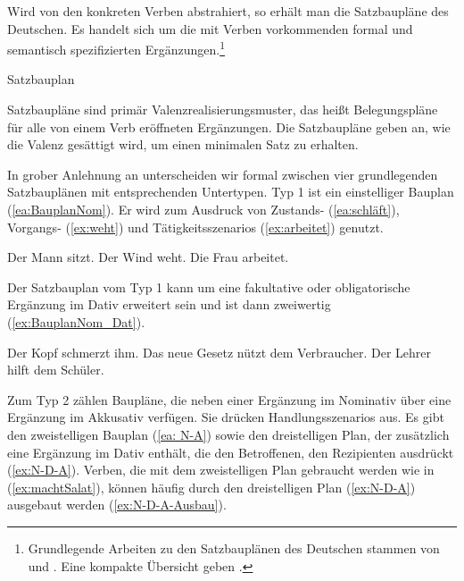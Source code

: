 Wird von den konkreten Verben abstrahiert, so erhält man die Satzbaupläne des Deutschen. Es handelt sich um die mit Verben vorkommenden formal und semantisch spezifizierten Ergänzungen.\footnote{Grundlegende Arbeiten zu den Satzbauplänen des Deutschen stammen von \citet{Engelen1975} und \citet{Engelen1975b}. Eine kompakte Übersicht geben \citet[235--241]{AgelHoellein2021}.}

\begin{Definition}{Satzbauplan}
    
\noindent Satzbaupläne sind primär Valenzrealisierungsmuster, das heißt Belegungspläne für alle von einem Verb eröffneten Ergänzungen. Die Satzbaupläne geben an, wie die Valenz gesättigt wird, um einen minimalen Satz zu erhalten. 
\end{Definition}



In grober Anlehnung an \citet[236--239]{Welke1994} unterscheiden wir formal zwischen vier grundlegenden Satzbauplänen mit entsprechenden Untertypen. Typ 1 ist ein einstelliger Bauplan (\ref{ea:BauplanNom}). Er wird zum Ausdruck von Zustands- (\ref{ea:schläft}), Vorgangs- (\ref{ex:weht}) und Tätigkeitsszenarios (\ref{ex:arbeitet}) genutzt.


\ea\label{ea:BauplanNom}  
\ea \label{ea:schläft} Der Mann sitzt.
\ex \label{ex:weht} Der Wind weht.
\ex \label{ex:arbeitet} Die Frau arbeitet.
\z 
\z 

Der Satzbauplan vom Typ 1 kann um eine fakultative oder obligatorische Ergänzung im Dativ erweitert sein und ist dann zweiwertig (\ref{ex:BauplanNom_Dat}).

\ea\label{ex:BauplanNom_Dat}  
\ea \label{ea:schmerzt} Der Kopf schmerzt ihm.
\ex \label{ex:nütz} Das neue Gesetz nützt dem Verbraucher.
\ex \label{ex:hilft} Der Lehrer hilft dem Schüler.
\z 
\z 

Zum Typ 2 zählen Baupläne, die neben einer Ergänzung im Nominativ über eine Ergänzung im Akkusativ verfügen. Sie drücken Handlungsszenarios aus. Es gibt den zweistelligen Bauplan (\ref{ea: N-A}) sowie den dreistelligen Plan, der zusätzlich eine Ergänzung im Dativ enthält, die den Betroffenen, \zB den Rezipienten ausdrückt (\ref{ex:N-D-A}). Verben, die mit dem zweistelligen Plan gebraucht werden wie in (\ref{ex:machtSalat}), können häufig durch den dreistelligen Plan (\ref{ex:N-D-A}) ausgebaut werden (\ref{ex:N-D-A-Ausbau}).


